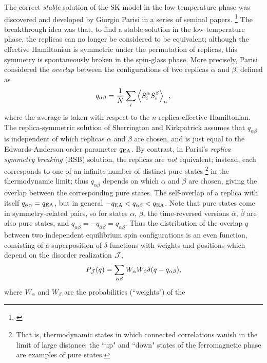 The correct \emph{stable} solution of the SK model in the low-temperature phase
was discovered and developed by Giorgio Parisi in a series of seminal papers.%
\footnote{%
  \textcite{%
    parisi1979infinite,
    parisi1980magnetic,
    parisi1980order,
    parisi1983order,
  }
}
The breakthrough idea was that, to find a stable solution in the
low-temperature phase, the replicas can no longer be considered to be
equivalent; although the effective Hamiltonian is symmetric under the
permutation of replicas, this symmetry is spontaneously broken in the
spin-glass phase. More precisely, Parisi considered the \emph{overlap} between
the configurations of two replicas $\alpha$ and $\beta$, defined as
\begin{equation}
  q_{\alpha\beta} = \frac{1}{N} \sum_i \left< S_i^{\alpha} S_i^{\beta} \right>_n,
\end{equation}
where the average is taken with respect to the $n$-replica effective
Hamiltonian. The replica-symmetric solution of Sherrington and Kirkpatrick
assumes that $q_{\alpha\beta}$ is independent of which replicas $\alpha$ and
$\beta$ are chosen, and is just equal to the Edwards-Anderson order parameter
$q_{\mathrm{EA}}$. By contrast, in Parisi's \emph{replica symmetry breaking} (RSB)
solution, the replicas are \emph{not} equivalent; instead, each corresponds to
one of an infinite number of distinct pure states%
\footnote{%
  That is, thermodynamic states in which connected correlations vanish in the
  limit of large distance; the ``up" and ``down" states of the ferromagnetic
  phase are examples of pure states.
}
in the thermodynamic limit; thus $q_{\alpha\beta}$ depends on which $\alpha$
and $\beta$ are chosen, giving the overlap between the corresponding pure
states. The self-overlap of a replica with itself $q_{\alpha\alpha}=q_{\mathrm{EA}}$, but
in general $-q_{\mathrm{EA}} < q_{\alpha\beta} < q_{\mathrm{EA}}$. Note that pure states come in
symmetry-related pairs, so for states $\alpha$, $\beta$, the time-reversed
versions $\overline{\alpha}$, $\overline{\beta}$ are also pure states, and
$q_{\alpha\beta}=-q_{\overline{\alpha}\beta}=q_{\alpha\overline{\beta}}$. Thus
the distribution of the overlap $q$ between two independent equilibrium spin
configurations is an even function, consisting of a superposition of
$\delta$-functions with weights and positions which depend on the disorder
realization $\mathcal{J}$,
\begin{equation}
  P_{\mathcal{J}}(q) = \sum_{\alpha\beta} W_{\alpha} W_{\beta} \delta(q - q_{\alpha\beta}),
\end{equation}
where $W_{\alpha}$ and $W_{\beta}$ are the probabilities (``weights") of the
